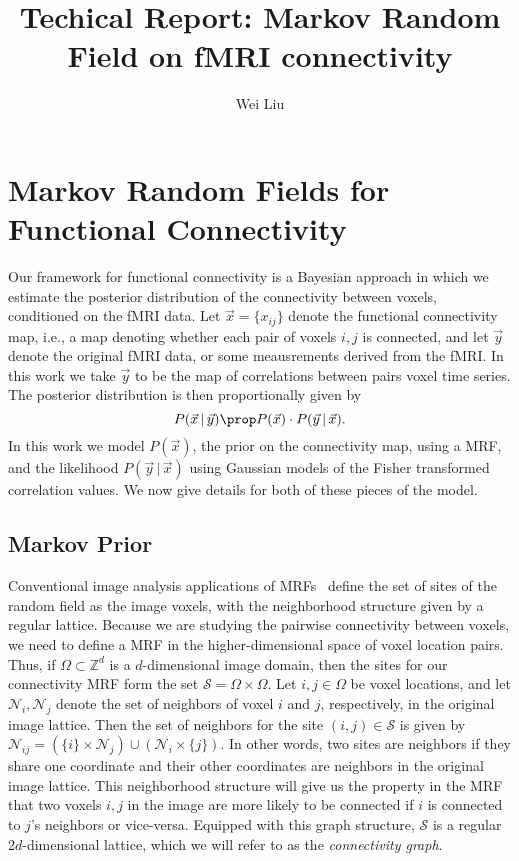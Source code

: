 \documentclass[12pt]{article}
\begin{document}
\title{Techical Report: Markov Random Field on fMRI connectivity}
\author{Wei Liu}
\maketitle
\tableofcontents

\section{Markov Random Fields for Functional Connectivity}
\label{sec:model}
Our framework for functional connectivity is a Bayesian approach in
which we estimate the posterior distribution of the connectivity
between voxels, conditioned  on the fMRI data. Let $\vec x =
\{x_{ij}\}$ denote the functional connectivity map, i.e., a map
denoting whether each pair of voxels $i,j$ is connected, and let $\vec
y$ denote the original fMRI data, or some meausrements derived from
the fMRI. In this work we take $\vec y$ to be the map of correlations
between pairs voxel time series. The posterior distribution is then
proportionally given by
\begin{equation}
  \label{eq:posterior}
  P(\vec x \, | \, \vec y) \prop P(\vec x) \cdot P(\vec y \, | \, \vec x).
\end{equation}
In this work we model $P(\vec x)$, the prior on the connectivity map, using a
MRF, and the likelihood $P(\vec y \, | \, \vec x)$ using Gaussian models of the
Fisher transformed correlation values. We now give details for both of these
pieces of the model.
\subsection{Markov Prior}
Conventional image analysis applications of MRFs~\citep{li_markov_2009} define the set of
sites of the random field as the image voxels, with the neighborhood structure
given by a regular lattice. Because we are studying the pairwise connectivity
between voxels, we need to define a MRF in the higher-dimensional space of voxel
location pairs. Thus, if $\Omega \subset \mathbb{Z}^d$ is a $d$-dimensional
image domain, then the sites for our connectivity MRF form the set $\mathcal{S}
= \Omega \times \Omega$. Let $i, j \in \Omega$ be voxel locations, and let
$\mathcal{N}_i, \mathcal{N}_j$ denote the set of neighbors of voxel $i$ and $j$,
respectively, in the original image lattice. Then the set of neighbors for the
site $(i, j) \in \mathcal{S}$ is given by $\mathcal{N}_{ij} = (\{i\} \times
\mathcal{N}_j) \cup (\mathcal{N}_i \times \{j\})$. In other words, two sites are
neighbors if they share one coordinate and their other coordinates are neighbors
in the original image lattice. This neighborhood structure will give us the
property in the MRF that two voxels $i, j$ in the image are more likely to be
connected if $i$ is connected to $j$'s neighbors or vice-versa. Equipped with
this graph structure, $\mathcal{S}$ is a regular $2d$-dimensional lattice, which
we will refer to as the {\em connectivity graph}.
\end{document}
